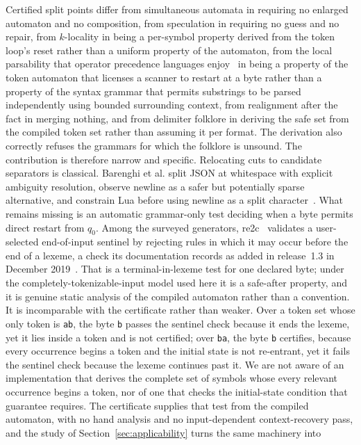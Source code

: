 \documentclass[11pt,a4paper]{article}
\theoremstyle{definition}
\theoremstyle{plain}
\newcommand{\code}[1]{\texttt{#1}}
\begin{document}
Certified split points differ from simultaneous automata in requiring no enlarged automaton and no composition, from
speculation in requiring no guess and no repair, from $k$-locality in being a per-symbol property derived from the
token loop's reset rather than a uniform property of the automaton, from the local parsability that operator
precedence languages enjoy~\cite{barenghi2015parallel} in being a property of the token automaton that licenses a
scanner to restart at a byte rather than a property of the syntax grammar that permits substrings to be parsed
independently using bounded surrounding context, from realignment after the fact in merging nothing, and from
delimiter folklore in deriving the safe set from the compiled token set rather than assuming it per format. The
derivation also correctly refuses the grammars for which the folklore is unsound. The contribution is therefore narrow
and specific. Relocating cuts to candidate separators is classical. Barenghi et al. split JSON at whitespace with
explicit ambiguity resolution, observe newline as a safer but potentially sparse alternative, and constrain Lua before
using newline as a split character~\cite{barenghi2015parallel}. What remains missing is an automatic grammar-only test
deciding when a byte permits direct restart from $q_0$. Among the surveyed generators, re2c~\cite{trofimovich2020re2c}
validates a user-selected end-of-input sentinel by rejecting rules in which it may occur before the end of a lexeme, a
check its documentation records as added in release~1.3 in December 2019~\cite{re2cdocs}. That is a terminal-in-lexeme
test for one declared byte; under the completely-tokenizable-input model used here it is a safe-after property, and it
is genuine static analysis of the compiled automaton rather than a convention. It is incomparable with the certificate
rather than weaker. Over a token set whose only token is \code{ab}, the byte \code{b} passes the sentinel check
because it ends the lexeme, yet it lies inside a token and is not certified; over \code{ba}, the byte \code{b}
certifies, because every occurrence begins a token and the initial state is not re-entrant, yet it fails the sentinel
check because the lexeme continues past it. We are not aware of an implementation that derives the complete set of
symbols whose every relevant occurrence begins a token, nor of one that checks the initial-state condition that
guarantee requires. The certificate supplies that test from the compiled automaton, with no hand analysis and no
input-dependent context-recovery pass, and the study of Section~\ref{sec:applicability} turns the same machinery into
\end{document}
